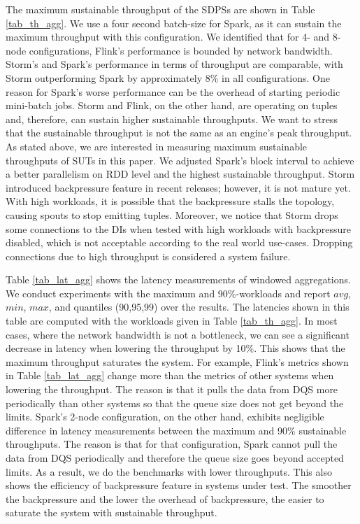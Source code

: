 %

The maximum sustainable throughput of the SDPSs are shown in Table \ref{tab_th_agg}. We use a four second batch-size for  Spark, as it can sustain the  maximum throughput with this configuration. We identified that for 4- and 8-node configurations, Flink's performance is bounded by network bandwidth.  Storm's and Spark's performance in terms of throughput are comparable, with Storm outperforming Spark by approximately 8\% in all configurations. One reason for Spark's worse performance can be the  overhead of starting periodic  mini-batch jobs. %
Storm and Flink, on the other hand, are operating on tuples and, therefore, can sustain higher sustainable throughputs. %
 We want to stress that the sustainable throughput is not the same as an engine's peak throughput. %
 As stated above, we are interested in measuring maximum sustainable  throughputs of SUTs in this paper.  We adjusted Spark's block interval to achieve a better parallelism on RDD level and the highest sustainable throughput. Storm introduced  backpressure feature in recent releases; however, it is not mature yet. With high workloads, it is possible that the backpressure stalls the topology, causing spouts to stop emitting tuples. Moreover, we notice that Storm  drops some connections to the DIs when tested with high workloads with backpressure disabled, which is not acceptable according to the real world use-cases. Dropping connections due to high throughput is considered  a system failure.


Table \ref{tab_lat_agg} shows the latency measurements of windowed aggregations. We conduct experiments with the maximum and 90\%-workloads and report $avg$, $min$, $max$, and  quantiles (90,95,99) over the results. %
 The latencies shown in this table are computed with the workloads given in Table \ref{tab_th_agg}.  In most cases, where the network bandwidth is not a bottleneck, we can see a significant decrease in latency when lowering the throughput by 10\%. This shows that the maximum throughput saturates the system.  For example, Flink's metrics shown in Table  \ref{tab_lat_agg} change more than the metrics of other systems when lowering the throughput. The reason is that it pulls the data from DQS more periodically than other systems so that the queue size does not get beyond the limits. 
 Spark's 2-node configuration, on the other hand, exhibits negligible difference in latency measurements between the maximum and 90\% sustainable throughputs.  The reason is that for that configuration, Spark cannot pull the data from DQS periodically and therefore the queue size goes beyond accepted limits. As a result, we do the benchmarks with lower throughputs. 
This also shows the efficiency of backpressure feature in systems under test. The smoother the backpressure and the lower the overhead of backpressure, the easier to saturate the system with sustainable throughput. 

